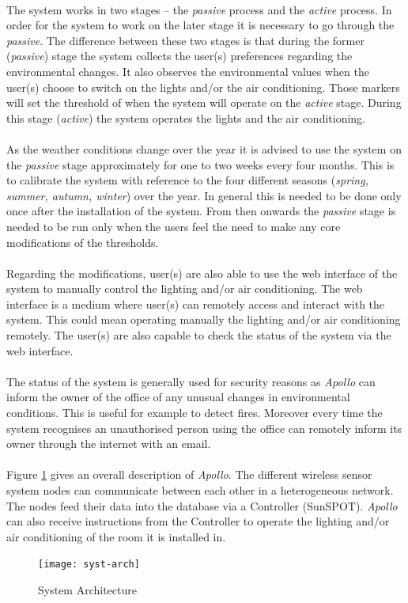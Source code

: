 \documentclass[12pt,a4paper,draft]{report}
\begin{document}
\ \\
The system works in two stages -- the \emph{passive} process and the \emph{active} process.
In order for the system to work on the later stage it is necessary to go through the \emph{passive}.
The difference between these two stages is that during the former (\emph{passive}) stage the system collects the user(s) preferences regarding the environmental changes.
It also observes the environmental values when the user(s) choose to switch on the lights and/or the air conditioning.
Those markers will set the threshold of when the system will operate on the \emph{active} stage.
During this stage (\textit{active}) the system operates the lights and the air conditioning.\\
\ \\
As the weather conditions change over the year it is advised to use the system on the \emph{passive} stage approximately for one to two weeks every four months. This is to calibrate the system with reference to the four different seasons (\textit{spring, summer, autumn, winter}) over the year. In general this is needed to be done only once after the installation of the system. From then onwards the \emph{passive} stage is needed to be run only when the users feel the need to make any core modifications of the thresholds.\\
\ \\
Regarding the modifications, user(s) are also able to use the web interface of the system to manually control the lighting and/or air conditioning. The web interface is a medium where user(s) can remotely access and interact with the system. This could mean operating manually the lighting and/or air conditioning remotely. The user(s) are also capable to check the status of the system via the web interface.\\
\ \\
The status of the system is generally used for security reasons as \emph{Apollo} can inform the owner of the office of any unusual changes in environmental conditions. This is useful for example to detect fires. Moreover every time the system recognises an unauthorised person using the office can remotely inform its owner through the internet with an email.\\
\ \\
Figure \ref{syst-arch} gives an overall description of \emph{Apollo}. The different wireless sensor system nodes can communicate between each other in a heterogeneous network.
The nodes feed their data into the database via a Controller (SunSPOT).
\emph{Apollo} can also receive instructions from the Controller to operate the lighting and/or air conditioning of the room it is installed in.
\ \\
\begin{figure}[H]
\centering
\texttt{[image: syst-arch]}
\caption{System Architecture}
\label{syst-arch}
\end{figure}
\ \\
%
\newpage
%
\end{document}
